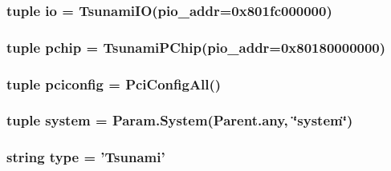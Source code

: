 \label{classTsunami_1_1Tsunami_ab69ff40cdffeeb758945921ff6accded}
\hypertarget{classTsunami_1_1Tsunami_a2c4f3d37bf2004da1c3daf41d84880f4}{
\subsubsection[{io}]{\setlength{\rightskip}{0pt plus 5cm}tuple {\bf io} = {\bf TsunamiIO}(pio\_\-addr=0x801fc000000)}}
\label{classTsunami_1_1Tsunami_a2c4f3d37bf2004da1c3daf41d84880f4}
\hypertarget{classTsunami_1_1Tsunami_a73949d263d2a10394d96cd92a6d5bd00}{
\subsubsection[{pchip}]{\setlength{\rightskip}{0pt plus 5cm}tuple {\bf pchip} = {\bf TsunamiPChip}(pio\_\-addr=0x80180000000)}}
\label{classTsunami_1_1Tsunami_a73949d263d2a10394d96cd92a6d5bd00}
\hypertarget{classTsunami_1_1Tsunami_af76b12e7e603a8ef5f908080bb3e6fab}{
\subsubsection[{pciconfig}]{\setlength{\rightskip}{0pt plus 5cm}tuple {\bf pciconfig} = {\bf PciConfigAll}()}}
\label{classTsunami_1_1Tsunami_af76b12e7e603a8ef5f908080bb3e6fab}
\hypertarget{classTsunami_1_1Tsunami_ab737471139f5a296e5b26e8a0e1b0744}{
\subsubsection[{system}]{\setlength{\rightskip}{0pt plus 5cm}tuple {\bf system} = Param.System(Parent.any, \char`\"{}system\char`\"{})}}
\label{classTsunami_1_1Tsunami_ab737471139f5a296e5b26e8a0e1b0744}
\hypertarget{classTsunami_1_1Tsunami_acce15679d830831b0bbe8ebc2a60b2ca}{
\subsubsection[{type}]{\setlength{\rightskip}{0pt plus 5cm}string {\bf type} = '{\bf Tsunami}'}}
\label{classTsunami_1_1Tsunami_acce15679d830831b0bbe8ebc2a60b2ca}


